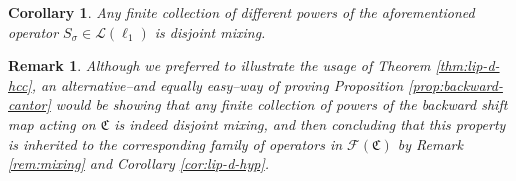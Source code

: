 \documentclass[11pt,reqno]{article}
\newtheorem{corollary}[statement]{Corollary}
\newtheorem{remark}[statement]{Remark}
\def\cantor{\mathfrak{C}}
\def\id{\text{Id}}
\newcommand{\free}[1]{\mathcal{F}(#1)} %
\def\NN{\Bbb N}
\def\eor{\hfill{\circledR}}
\begin{document}
\begin{corollary}
    Any finite collection of different powers of the aforementioned operator $S_\sigma \in \mathcal{L}(\ell_1)$ is disjoint mixing. 
\end{corollary}





\begin{remark}
    \rm
Although we preferred to illustrate the usage of Theorem \ref{thm:lip-d-hcc}, an alternative--and equally easy--way of proving Proposition \ref{prop:backward-cantor} would be showing that any finite collection of powers of the backward shift map acting on $\cantor$ is indeed disjoint mixing, and then concluding that this property is inherited to the corresponding family of operators in $\free{\cantor}$ by Remark \ref{rem:mixing} and Corollary \ref{cor:lip-d-hyp}. 

\eor
\end{remark}
\end{document}
